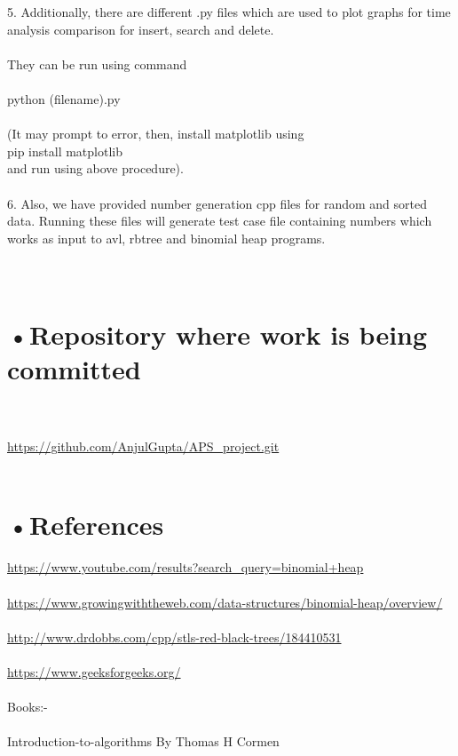 \documentclass[10pt,a4paper]{article}
\begin{document}
5. Additionally, there are different .py files which are used to plot graphs for time analysis comparison for insert, search and delete.\\ \\
They can be run using command \\ \\
python (filename).py \\ \\

(It may prompt to error, then, install matplotlib using \\
pip install matplotlib \\
and run using above procedure). \\ \\

6. Also, we have provided number generation cpp files for random and sorted data. Running these files will generate test case file containing numbers which works as input to avl, rbtree and binomial heap programs. \\ \\ \\
		
		
		\section*{•Repository where work is being committed} \\ \\
		\url{https://github.com/AnjulGupta/APS\_project.git} \\ \\
		
		\section*{•References}
		\url{https://www.youtube.com/results?search_query=binomial+heap} \\ \\
     \url{https://www.growingwiththeweb.com/data-structures/binomial-heap/overview/} \\ \\
	\url{http://www.drdobbs.com/cpp/stls-red-black-trees/184410531} \\ \\
	\url{https://www.geeksforgeeks.org/} \\ \\
 
Books:- \\ \\
	Introduction-to-algorithms By Thomas H Cormen

	
	
\end{document}
